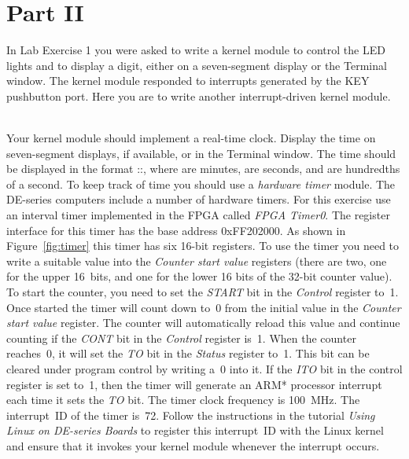 \documentclass[epsfig,10pt,fullpage]{article}
\begin{document}
\section*{Part II}
\noindent
In Lab Exercise 1 you were asked to write a kernel module to control the LED lights and
to display a digit, either on a seven-segment display or the Terminal window. 
The kernel module responded to interrupts
generated by the KEY pushbutton port. Here you are to write another interrupt-driven
kernel module.

~\\
\noindent
Your kernel module should implement a real-time clock. Display the time on seven-segment
displays, if available, or in the Terminal window. The time
should be displayed in the format ::, where  are minutes, 
 are seconds, and  are hundredths of a second. 
To keep track of time you
should use a {\it hardware timer} module. The DE-series computers include a 
number of hardware timers.  For this exercise use an interval timer implemented 
in the FPGA called {\it FPGA Timer0}.
The register interface for this timer has the base address {\sf 0xFF202000}. As shown in 
Figure~\ref{fig:timer} this timer has six 16-bit registers. To use the timer you need
to write a suitable value into the {\it Counter start value} registers (there are two, one for the
upper 16~bits, and one for the lower 16 bits of the 32-bit counter value). To start the
counter, you need to set the {\it START} bit in the {\it Control} register to~1. Once
started the timer will count down to~0 from the initial value in the {\it Counter start
value} register.  The counter will automatically reload this value and continue counting 
if the {\it CONT} bit in the {\it Control} register is~1. When the counter reaches~0,
it will set the {\it TO} bit in the {\it Status} register to~1. This bit can be cleared 
under program control by writing a~0 into it. If the {\it ITO} bit in the control register is 
set to~1, then the timer will generate an ARM* processor interrupt each time 
it sets the {\it TO} bit.
The timer clock frequency is 100~MHz. The interrupt~ID of the timer is~72.
Follow the instructions in the tutorial {\it Using Linux on DE-series Boards} to register this
interrupt~ID with the Linux kernel and ensure that it invokes your kernel module whenever
the interrupt occurs.
\end{document}
